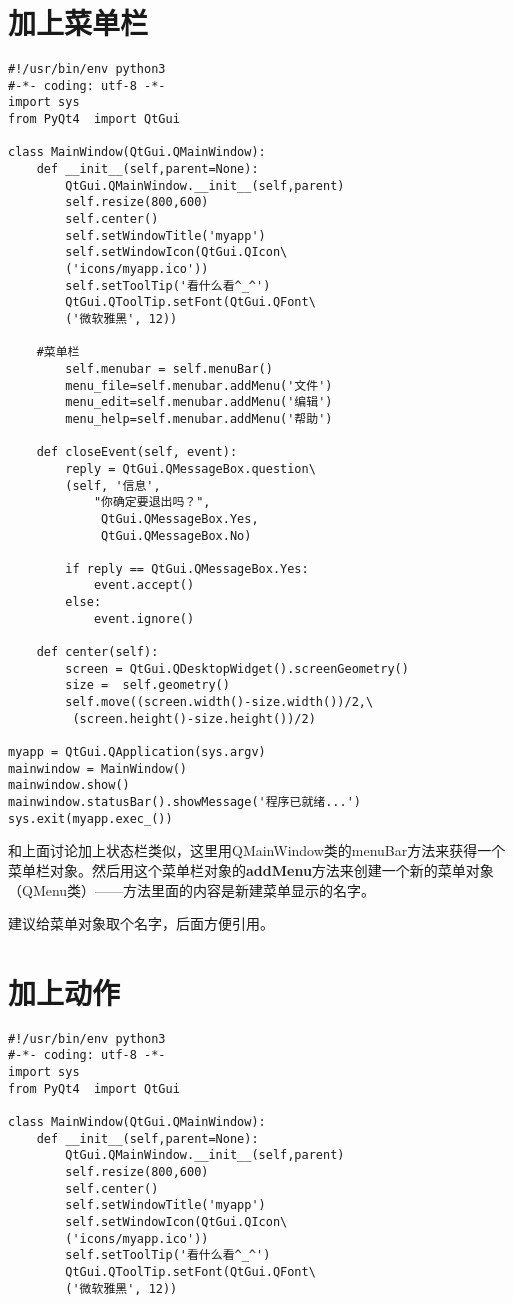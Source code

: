 \documentclass[12pt,oneside]{book}
\begin{document}
\begin{common-format}
\section{加上菜单栏}
\begin{Verbatim}
#!/usr/bin/env python3
#-*- coding: utf-8 -*-
import sys
from PyQt4  import QtGui

class MainWindow(QtGui.QMainWindow):
    def __init__(self,parent=None):
        QtGui.QMainWindow.__init__(self,parent)
        self.resize(800,600)
        self.center()
        self.setWindowTitle('myapp')
        self.setWindowIcon(QtGui.QIcon\
        ('icons/myapp.ico'))
        self.setToolTip('看什么看^_^')
        QtGui.QToolTip.setFont(QtGui.QFont\
        ('微软雅黑', 12))

    #菜单栏
        self.menubar = self.menuBar()
        menu_file=self.menubar.addMenu('文件')
        menu_edit=self.menubar.addMenu('编辑')
        menu_help=self.menubar.addMenu('帮助')

    def closeEvent(self, event):
        reply = QtGui.QMessageBox.question\
        (self, '信息',
            "你确定要退出吗？",
             QtGui.QMessageBox.Yes,
             QtGui.QMessageBox.No)

        if reply == QtGui.QMessageBox.Yes:
            event.accept()
        else:
            event.ignore()

    def center(self):
        screen = QtGui.QDesktopWidget().screenGeometry()
        size =  self.geometry()
        self.move((screen.width()-size.width())/2,\
         (screen.height()-size.height())/2)

myapp = QtGui.QApplication(sys.argv)
mainwindow = MainWindow()
mainwindow.show()
mainwindow.statusBar().showMessage('程序已就绪...')
sys.exit(myapp.exec_())
\end{Verbatim}
和上面讨论加上状态栏类似，这里用QMainWindow类的menuBar方法来获得一个菜单栏对象。然后用这个菜单栏对象的\textbf{addMenu}方法来创建一个新的菜单对象（QMenu类）——方法里面的内容是新建菜单显示的名字。

建议给菜单对象取个名字，后面方便引用。



\section{加上动作}
\begin{Verbatim}
#!/usr/bin/env python3
#-*- coding: utf-8 -*-
import sys
from PyQt4  import QtGui

class MainWindow(QtGui.QMainWindow):
    def __init__(self,parent=None):
        QtGui.QMainWindow.__init__(self,parent)
        self.resize(800,600)
        self.center()
        self.setWindowTitle('myapp')
        self.setWindowIcon(QtGui.QIcon\
        ('icons/myapp.ico'))
        self.setToolTip('看什么看^_^')
        QtGui.QToolTip.setFont(QtGui.QFont\
        ('微软雅黑', 12))


\end{Verbatim}
\end{common-format}
\end{document}
